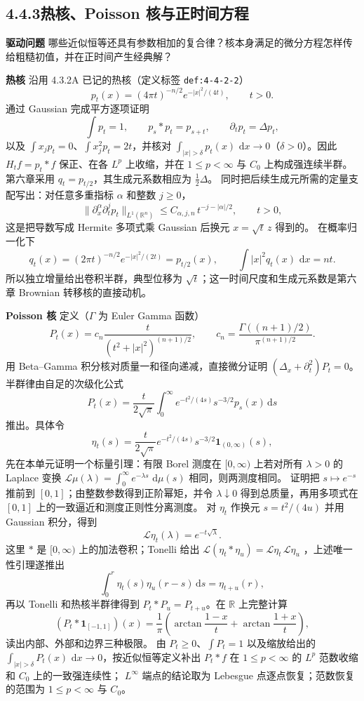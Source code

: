 \documentclass[11pt,a4paper]{ctexart}
\newcommand{\R}{\mathbb R}
\newcommand{\dd}{\,\mathrm d}
\newcommand{\planitem}[1]{\par\smallskip\noindent\textcolor{deepblue}{\textbf{#1}}\quad}
\newcommand{\unithead}[2]{\subsection{#1\quad #2}}
\begin{document}
\unithead{4.4.3}{热核、Poisson 核与正时间方程}

\planitem{驱动问题}
哪些近似恒等还具有参数相加的复合律？核本身满足的微分方程怎样传给粗糙初值，并在正时间产生经典解？

\planitem{热核}
沿用 4.3.2A 已记的热核（定义标签 \texttt{def:4-4-2-2}）
\[
p_t(x)=(4\pi t)^{-n/2}e^{-|x|^2/(4t)},\qquad t>0.
\]
通过 Gaussian 完成平方逐项证明
\[
\int p_t=1,\qquad p_s*p_t=p_{s+t},\qquad
\partial_tp_t=\Delta p_t,
\]
以及 $\int x_jp_t=0$、$\int x_j^2p_t=2t$，并核对
$\int_{|x|>\delta}p_t(x)\,\dd x\to0$（$\delta>0$）。因此
$H_tf=p_t*f$ 保正、在各 $L^p$ 上收缩，并在 $1\le p<\infty$ 与 $C_0$ 上构成强连续半群。第六章采用
$q_t=p_{t/2}$，其生成元系数相应为 $\tfrac12\Delta$。
同时把后续生成元所需的定量支配写出：对任意多重指标 $\alpha$ 和整数 $j\ge0$，
\[
 \|\partial_x^\alpha\partial_t^j p_t\|_{L^1(\R^n)}
 \le C_{\alpha,j,n}\,t^{-j-|\alpha|/2},\qquad t>0,
\]
这是把导数写成 Hermite 多项式乘 Gaussian 后换元 $x=\sqrt t\,z$ 得到的。
在概率归一化下
\[
 q_t(x)=(2\pi t)^{-n/2}e^{-|x|^2/(2t)}=p_{t/2}(x),
 \qquad \int|x|^2q_t(x)\,\dd x=nt.
\]
所以独立增量给出卷积半群，典型位移为 $\sqrt t$；这一时间尺度和生成元系数是第六章
Brownian 转移核的直接动机。

\planitem{Poisson 核}
定义（$\Gamma$ 为 Euler Gamma 函数）
\[
P_t(x)=c_n\frac{t}{(t^2+|x|^2)^{(n+1)/2}},
\qquad c_n=\frac{\Gamma((n+1)/2)}{\pi^{(n+1)/2}}.
\]
用 Beta--Gamma 积分核对质量一和径向递减，直接微分证明
$(\Delta_x+\partial_t^2)P_t=0$。半群律由自足的次级化公式
\[
P_t(x)=\frac{t}{2\sqrt\pi}
\int_0^\infty e^{-t^2/(4s)}s^{-3/2}p_s(x)\dd s
\]
推出。具体令
\[
\eta_t(s)=\frac{t}{2\sqrt\pi}e^{-t^2/(4s)}s^{-3/2}
\mathbf1_{(0,\infty)}(s),
\]
先在本单元证明一个标量引理：有限 Borel 测度在 $[0,\infty)$ 上若对所有
$\lambda>0$ 的 Laplace 变换
$\mathcal L\mu(\lambda)=\int_0^\infty e^{-\lambda s}\,\dd\mu(s)$ 相同，则两测度相同。
证明把 $s\mapsto e^{-s}$ 推前到 $[0,1]$；由整数参数得到正阶幂矩，并令
$\lambda\downarrow0$ 得到总质量，再用多项式在 $[0,1]$ 上的一致逼近和测度正则性分离测度。
对 $\eta_t$ 作换元
$s=t^2/(4u)$ 并用 Gaussian 积分，得到
\[
\mathcal L\eta_t(\lambda)=e^{-t\sqrt\lambda}.
\]
这里 $*$ 是 $[0,\infty)$ 上的加法卷积；Tonelli 给出
$\mathcal L(\eta_t*\eta_u)=\mathcal L\eta_t\,\mathcal L\eta_u$
，上述唯一性引理遂推出
\[
\int_0^r\eta_t(s)\eta_u(r-s)\dd s=\eta_{t+u}(r),
\]
再以 Tonelli 和热核半群律得到 $P_t*P_u=P_{t+u}$。在 $\R$ 上完整计算
\[
(P_t*\mathbf1_{[-1,1]})(x)=\frac1\pi
\left(\arctan\frac{1-x}{t}+\arctan\frac{1+x}{t}\right),
\]
读出内部、外部和边界三种极限。
由 $P_t\ge0$、$\int P_t=1$ 以及缩放给出的
$\int_{|x|>\delta}P_t(x)\,\dd x\to0$，按近似恒等定义补出
$P_t*f$ 在 $1\le p<\infty$ 的 $L^p$ 范数收缩和 $C_0$ 上的一致强连续性；
$L^\infty$ 端点的结论取为 Lebesgue 点逐点恢复；范数恢复的范围为 $1\le p<\infty$ 与 $C_0$。
\end{document}
